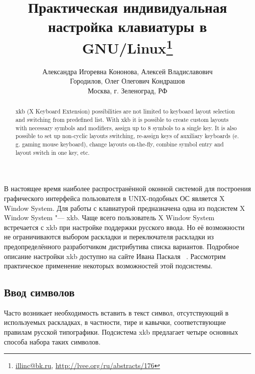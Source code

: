 \documentclass[10pt, a5paper]{article}
\begin{document}
\title{Практическая индивидуальная настройка клавиатуры в GNU/Linux\footnote{\url{illinc@bk.ru}, \url{http://lvee.org/ru/abstracts/176}}}
\author{Александра Игоревна Кононова, Алексей Владиславович \\ Городилов, Олег Олегович Кондрашов \\ Москва, г. Зеленоград, РФ}
\maketitle
\begin{abstract}
xkb (X Keyboard Extension) possibilities are not limited to keyboard layout selection and switching from predefined list.
With xkb it is possible to create custom layouts with necessary symbols and modifiers, assign up to 8 symbols to a single key. It is also possible to set up non-cyclic layouts switching, re-assign keys of auxiliary keyboards (e. g. gaming mouse keyboard), change layouts on-the-fly, combine symbol entry and layout switch in one key, etc.
\end{abstract}

В настоящее время наиболее распространённой оконной системой для построения графического интерфейса пользователя в UNIX-подобных ОС является X Window System. Для работы с клавиатурой предназначена одна из подсистем X Window System "--- xkb. 
Чаще всего пользователь X Window System встречается с xkb при настройке поддержки русского ввода. Но её возможности не ограничиваются выбором раскладки и переключателя раскладки из предопределённого разработчиком дистрибутива списка вариантов. Подробное описание настройки xkb доступно на сайте Ивана Паскаля ~\cite{Kononova1}. Рассмотрим практическое применение некоторых возможностей этой подсистемы.

\subsection*{Ввод символов}

Часто возникает необходимость вставить в текст символ, отсутствующий в используемых раскладках, в частности, тире и кавычки, соответствующие правилам русской типографики. Подсистема xkb предлагает четыре основных способа набора таких символов.
\end{document}
